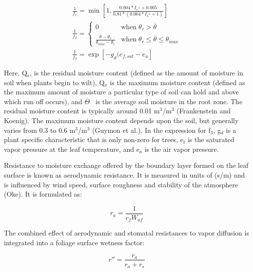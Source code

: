 \begin{equation}
\begin{array}{l}
   \frac{1}{f_1} = \min \left[ 1,\frac{{0.004*{I_s}^ \downarrow  + 0.005}}{{0.81*(0.004*{I_s}^ \downarrow  + 1)}} \right] \\
   \frac{1}{f_2} = \left\{ 
     \begin{array}{cl}
       0                                                                 & \text{when} \; \theta_r > \overline \theta \\
       \frac{ \overline \theta   - \theta_r }{ \theta_{max} - \theta_r } & \text{when} \; \theta_r \leq \overline \theta \leq \theta_{max}
     \end{array} \right. \\
   \frac{1}{f_3} = \exp \left[ - {g_d}({e_{f,sat}} - {e_a} \right]
\end{array}
\end{equation}

Here, Q\(_{r}\), is the residual moisture content (defined as the amount of moisture in soil when plants begin to wilt), Q\(_{x}\) is the maximum moisture content (defined as the maximum amount of moisture a particular type of soil can hold and above which run off occurs), and \(\overline \Theta\) ~is the average soil moisture in the root zone. The residual moisture content is typically around 0.01 m\(^{3}\)/m\(^{3}\) (Frankenstein and Koenig). The maximum moisture content depends upon the soil, but generally varies from 0.3 to 0.6 m\(^{3}\)/m\(^{3}\) (Guymon et al.). In the expression for f\(_{3}\), g\(_{d}\) is a plant specific characteristic that is only non-zero for trees, e\(_{t}\) is the saturated vapor pressure at the leaf temperature, and e\(_{a}\) is the air vapor pressure.

Resistance to moisture exchange offered by the boundary layer formed on the leaf surface is known as aerodynamic resistance. It is measured in units of (s/m) and is influenced by wind speed, surface roughness and stability of the atmosphere (Oke). It is formulated as:

\begin{equation}
{r_a} = \frac{1}{{{c_f}{W_{af}}}}
\end{equation}

The combined effect of aerodynamic and stomatal resistances to vapor diffusion is integrated into a foliage surface wetness factor:

\begin{equation}
r'' = \frac{{{r_a}}}{{{r_a} + {r_s}}}
\end{equation}

